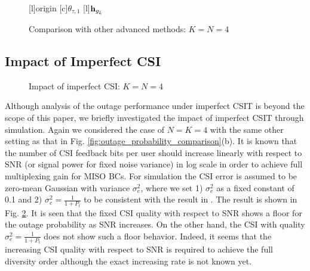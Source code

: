 \documentclass[11pt, draft, onecolumn ]{IEEEtran}
\def\scalefig#1{\epsfxsize #1\textwidth}
\begin{document}
\begin{figure}[h]
\begin{psfrags}
    [l]{\small origin} %
    [c]{\small $\theta_{\tau,1}$} %
    [l]{\small ${\bf h}_{g_{\hat{k}}}$} %
    \centerline{ \scalefig{0.5}  }
    \caption{Comparison with other advanced methods: $K=N=4$}
    \label{fig:comwithAdvancedTRX}
\end{psfrags}
\end{figure}




\subsection{Impact of Imperfect CSI}



\begin{figure}[h]
\begin{psfrags}
    \centerline{ \scalefig{0.5}  }
    \caption{Impact of imperfect CSI: $K=N=4$}
     \label{fig:imperfectCSI}
\end{psfrags}
\end{figure}

Although analysis  of the outage performance under imperfect CSIT is beyond the scope of this paper, we briefly investigated the impact of imperfect CSIT through simulation. Again we considered the case of $N=K=4$ with the same other setting as that in Fig. \ref{fig:outage_probability_comparison}(b).  It is known that the number of CSI feedback bits per user should increase linearly with respect to SNR  (or signal power for fixed noise variance) in log scale
in order to achieve full multiplexing gain for MISO BCs\cite{Jindal:06IT}.   For simulation the CSI error is assumed to be zero-mean Gaussian with variance $\sigma_{e}^2$, where we set 1) $\sigma_e^2$ as a fixed constant of 0.1 and 2) $\sigma_{e}^2 = \frac{1}{1+P_t}$ to be consistent with the result in \cite{Jindal:06IT}. The result is shown in Fig. \ref{fig:imperfectCSI}. It is seen that the fixed CSI quality with respect to SNR shows a floor for the outage probability as SNR increases. On the other hand, the CSI with quality $\sigma_e^2 = \frac{1}{1+P_t}$ does not show such a floor behavior. Indeed, it seems that the increasing CSI quality with respect to SNR is required to achieve the full diversity order although the exact increasing rate is not known yet.
\end{document}
